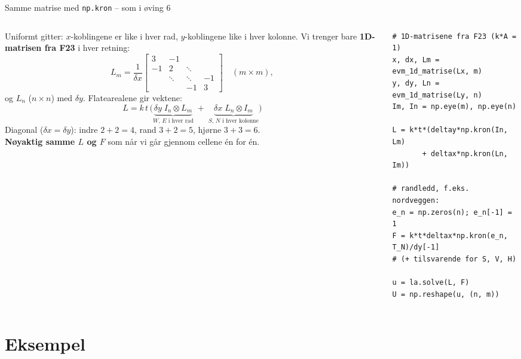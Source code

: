 \documentclass[11pt,aspectratio=169]{beamer}
\begin{document}
\begin{frame}[fragile]{Samme matrise med \texttt{np.kron} -- som i øving 6}
\begin{columns}[T]
\begin{column}{0.47\textwidth}
\footnotesize
Uniformt gitter: $x$-koblingene er like i hver rad, $y$-koblingene like i hver kolonne. Vi trenger bare \textbf{1D-matrisen fra F23} i hver retning:
\[
L_m = \frac{1}{\delta x}\begin{bmatrix} 3 & -1 & & \\ -1 & 2 & \ddots & \\ & \ddots & \ddots & -1 \\ & & -1 & 3\end{bmatrix}
\quad (m\times m),
\]
og $L_n$ ($n\times n$) med $\delta y$. Flatearealene gir vektene:
\[
L = k\,t\,\Big(\underbrace{\delta y\;I_n\otimes L_m}_{W,\,E \text{ i hver rad}} \;+\; \underbrace{\delta x\;L_n\otimes I_m}_{S,\,N \text{ i hver kolonne}}\Big)
\]
Diagonal ($\delta x=\delta y$): indre $2+2=4$, rand $3+2=5$, hjørne $3+3=6$.\\[1mm] \textbf{Nøyaktig samme $L$ og $F$} som når vi går gjennom cellene én for én.
\end{column}
\begin{column}{0.51\textwidth}
\begin{lstb}
\begin{lstlisting}[basicstyle=\ttfamily\scriptsize]
# 1D-matrisene fra F23 (k*A = 1)
x, dx, Lm = evm_1d_matrise(Lx, m)
y, dy, Ln = evm_1d_matrise(Ly, n)
Im, In = np.eye(m), np.eye(n)

L = k*t*(deltay*np.kron(In, Lm)
       + deltax*np.kron(Ln, Im))

# randledd, f.eks. nordveggen:
e_n = np.zeros(n); e_n[-1] = 1
F = k*t*deltax*np.kron(e_n, T_N)/dy[-1]
# (+ tilsvarende for S, V, H)

u = la.solve(L, F)
U = np.reshape(u, (n, m))
\end{lstlisting}
\end{lstb}
\end{column}
\end{columns}
\end{frame}

\section{Eksempel}
\end{document}
